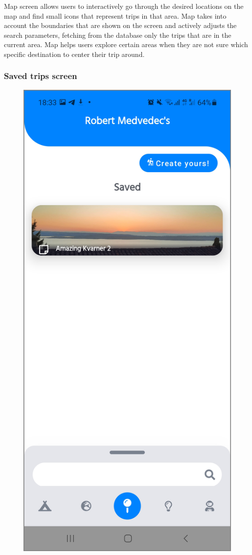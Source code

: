 Map screen allows users to interactively go through the desired locations on the map and find small icons that represent trips in that area. Map takes into account the boundaries that are shown on the screen and actively adjusts the search parameters, fetching from the database only the trips that are in the current area. Map helps users explore certain areas when they are not sure which specific destination to center their trip around.
\newpage

\subsubsection{Saved trips screen}
\begin{figure}[!htb]
\centering
\begin{minipage}{.48\textwidth}
\centering
\includegraphics[width=.9\textwidth]{../Images/UI/MyTripsWhite.jpg}

\end{minipage}
\end{figure}

